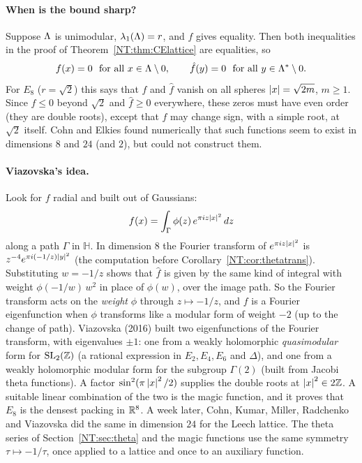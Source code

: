 \paragraph{When is the bound sharp?} Suppose $\Lambda$ is unimodular, $\lambda_1(\Lambda)=r$, and $f$ gives
equality. Then both inequalities in the proof of Theorem~\ref{NT:thm:CElattice} are equalities, so
\[
  f(x)=0\ \text{ for all }x\in\Lambda\setminus0,\qquad \hat f(y)=0\ \text{ for all }y\in\Lambda^*\setminus0.
\]
For $E_8$ ($r=\sqrt2$) this says that $f$ and $\hat f$ vanish on all spheres $\left\lvert x \right\rvert=\sqrt{2m}$, $m\ge1$. Since
$f\le0$ beyond $\sqrt2$ and $\hat f\ge0$ everywhere, these zeros must have even order (they are double roots),
except that $f$ may change sign, with a simple root, at $\sqrt2$ itself.
Cohn and Elkies found numerically that such functions seem to exist in dimensions $8$ and $24$ (and
$2$), but could not construct them.

\paragraph{Viazovska's idea.} Look for $f$ radial and built out of Gaussians:
\[
  f(x)=\int_{\Gamma}\phi(z)\,e^{\pi iz\left\lvert x \right\rvert^2}\,dz
\]
along a path $\Gamma$ in $\mathbb H$. In dimension $8$ the Fourier transform of $e^{\pi iz\left\lvert x \right\rvert^2}$ is
$z^{-4}e^{\pi i(-1/z)\left\lvert y \right\rvert^2}$ (the computation before Corollary~\ref{NT:cor:thetatrans}). Substituting
$w=-1/z$ shows that $\hat f$ is given by the same kind of integral with weight $\phi(-1/w)\,w^{2}$ in place of
$\phi(w)$, over the image path. So the Fourier transform acts on the \emph{weight} $\phi$ through
$z\mapsto-1/z$, and $f$ is a Fourier eigenfunction when $\phi$ transforms like a modular form of weight $-2$
(up to the change of path). Viazovska (2016) built two eigenfunctions of the Fourier transform, with
eigenvalues $\pm1$: one from a weakly holomorphic \emph{quasimodular} form for $\mathrm{SL}_2(\mathbb{Z})$ (a rational
expression in $E_2,E_4,E_6$ and $\Delta$), and one from a weakly holomorphic modular form for the subgroup
$\Gamma(2)$ (built from Jacobi theta functions). A factor $\sin^2(\pi\left\lvert x \right\rvert^2/2)$ supplies the
double roots at $\left\lvert x \right\rvert^2\in2\mathbb{Z}$. A suitable linear combination of the two is the magic function, and it proves that $E_8$ is the densest
packing in $\mathbb{R}^8$. A week later, Cohn, Kumar, Miller, Radchenko and Viazovska did the same in dimension
$24$ for the Leech lattice. The theta series of Section~\ref{NT:sec:theta} and the magic functions use
the same symmetry $\tau\mapsto-1/\tau$, once applied to a lattice and once to an auxiliary function.

